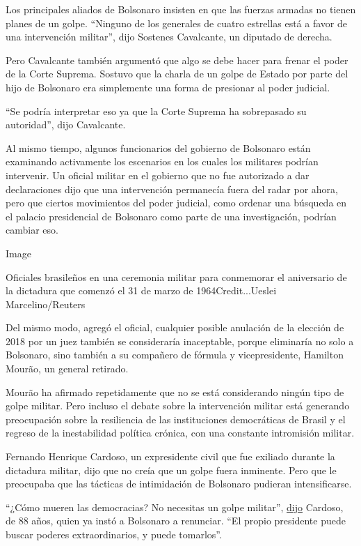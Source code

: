 Los principales aliados de Bolsonaro insisten en que las fuerzas armadas
no tienen planes de un golpe. ``Ninguno de los generales de cuatro
estrellas está a favor de una intervención militar'', dijo Sostenes
Cavalcante, un diputado de derecha.

Pero Cavalcante también argumentó que algo se debe hacer para frenar el
poder de la Corte Suprema. Sostuvo que la charla de un golpe de Estado
por parte del hijo de Bolsonaro era simplemente una forma de presionar
al poder judicial.

``Se podría interpretar eso ya que la Corte Suprema ha sobrepasado su
autoridad'', dijo Cavalcante.

Al mismo tiempo, algunos funcionarios del gobierno de Bolsonaro están
examinando activamente los escenarios en los cuales los militares
podrían intervenir. Un oficial militar en el gobierno que no fue
autorizado a dar declaraciones dijo que una intervención permanecía
fuera del radar por ahora, pero que ciertos movimientos del poder
judicial, como ordenar una búsqueda en el palacio presidencial de
Bolsonaro como parte de una investigación, podrían cambiar eso.

Image

Oficiales brasileños en una ceremonia militar para conmemorar el
aniversario de la dictadura que comenzó el 31 de marzo de
1964Credit...Ueslei Marcelino/Reuters

Del mismo modo, agregó el oficial, cualquier posible anulación de la
elección de 2018 por un juez también se consideraría inaceptable, porque
eliminaría no solo a Bolsonaro, sino también a su compañero de fórmula y
vicepresidente, Hamilton Mourão, un general retirado.

Mourão ha afirmado repetidamente que no se está considerando ningún tipo
de golpe militar. Pero incluso el debate sobre la intervención militar
está generando preocupación sobre la resiliencia de las instituciones
democráticas de Brasil y el regreso de la inestabilidad política
crónica, con una constante intromisión militar.

Fernando Henrique Cardoso, un expresidente civil que fue exiliado
durante la dictadura militar, dijo que no creía que un golpe fuera
inminente. Pero que le preocupaba que las tácticas de intimidación de
Bolsonaro pudieran intensificarse.

``¿Cómo mueren las democracias? No necesitas un golpe militar'',
\href{https://brasil.elpais.com/brasil/2020-05-31/fhc-quem-vai-ser-responsabilizado-pelos-erros-do-governo-queiram-ou-nao-serao-os-militares.html}{dijo}
Cardoso, de 88 años, quien ya instó a Bolsonaro a renunciar. ``El propio
presidente puede buscar poderes extraordinarios, y puede tomarlos''.

